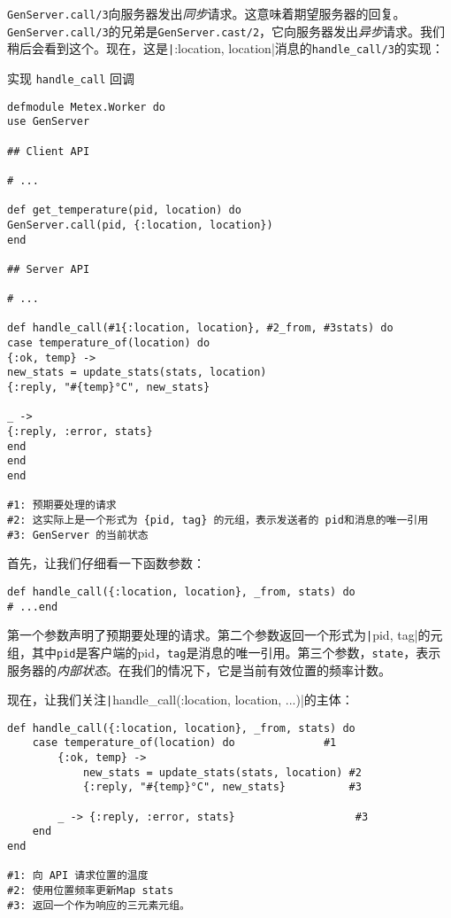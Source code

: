 \texttt{GenServer.call/3}向服务器发出\emph{同步}请求。这意味着期望服务器的回复。\texttt{GenServer.call/3}的兄弟是\texttt{GenServer.cast/2}，它向服务器发出\emph{异步}请求。我们稍后会看到这个。现在，这是\texttt|{:location, location}|消息的\texttt{handle\_call/3}的实现：


\begin{code}{实现 \texttt{handle\_call} 回调}
\begin{verbatim}
defmodule Metex.Worker do
use GenServer

## Client API

# ...

def get_temperature(pid, location) do
GenServer.call(pid, {:location, location})
end

## Server API

# ...

def handle_call(#1{:location, location}, #2_from, #3stats) do
case temperature_of(location) do
{:ok, temp} ->
new_stats = update_stats(stats, location)
{:reply, "#{temp}°C", new_stats}

_ ->
{:reply, :error, stats}
end
end
end

#1: 预期要处理的请求
#2: 这实际上是一个形式为 {pid, tag} 的元组，表示发送者的 pid和消息的唯一引用
#3: GenServer 的当前状态
\end{verbatim}
\label{lst:use_handle_call}
\end{code}

首先，让我们仔细看一下函数参数：

\begin{code}{}
\begin{verbatim}
def handle_call({:location, location}, _from, stats) do
# ...end
\end{verbatim}
\end{code}

第一个参数声明了预期要处理的请求。第二个参数返回一个形式为\texttt|{pid, tag}|的元组，其中\texttt{pid}是客户端的pid，\texttt{tag}是消息的唯一引用。第三个参数，\texttt{state}，表示服务器的\emph{内部状态}。在我们的情况下，它是当前有效位置的频率计数。

现在，让我们关注\texttt|handle_call({:location, location}, ...)|的主体：

\begin{code}{}
\begin{verbatim}
def handle_call({:location, location}, _from, stats) do
    case temperature_of(location) do              #1
        {:ok, temp} ->
            new_stats = update_stats(stats, location) #2
            {:reply, "#{temp}°C", new_stats}          #3

        _ -> {:reply, :error, stats}                   #3
    end
end

#1: 向 API 请求位置的温度 
#2: 使用位置频率更新Map stats  
#3: 返回一个作为响应的三元素元组。
\end{verbatim}
\end{code}



